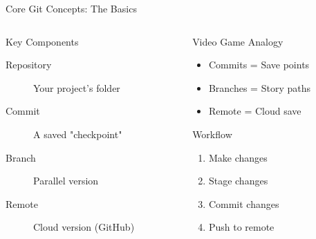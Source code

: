 \documentclass[aspectratio=169]{beamer}
\begin{document}
\begin{frame}{Core Git Concepts: The Basics}
  \begin{columns}
    \begin{column}{0.48\textwidth}
      \begin{block}{Key Components}
        \begin{description}
          \item[{\faFolderOpen\hspace{0.3em}Repository}] Your project's folder
          \item[{\faSave\hspace{0.3em}Commit}] A saved "checkpoint"
          \item[{\faCodeBranch\hspace{0.3em}Branch}] Parallel version
          \item[{\faCloud\hspace{0.3em}Remote}] Cloud version (GitHub)
        \end{description}
      \end{block}
      
      \vspace{0.5em}
      
    \end{column}
    
    \begin{column}{0.48\textwidth}
      \begin{exampleblock}{\faGamepad\hspace{0.5em}Video Game Analogy}
        \begin{itemize}
          \item {Commits = Save points}
          \item {Branches = Story paths}
          \item {Remote = Cloud save}
        \end{itemize}
      \end{exampleblock}
      
      \vspace{0.8em}
      
      \begin{block}{\faProjectDiagram\hspace{0.5em}Workflow}
        \begin{enumerate}
          \item {\faEdit\hspace{0.3em}Make changes}
          \item {\faLayerGroup\hspace{0.3em}Stage changes}
          \item {\faSave\hspace{0.3em}Commit changes}
          \item {\faShareSquare\hspace{0.3em}Push to remote}
        \end{enumerate}
      \end{block}
    \end{column}
  \end{columns}
\end{frame}
\end{document}
